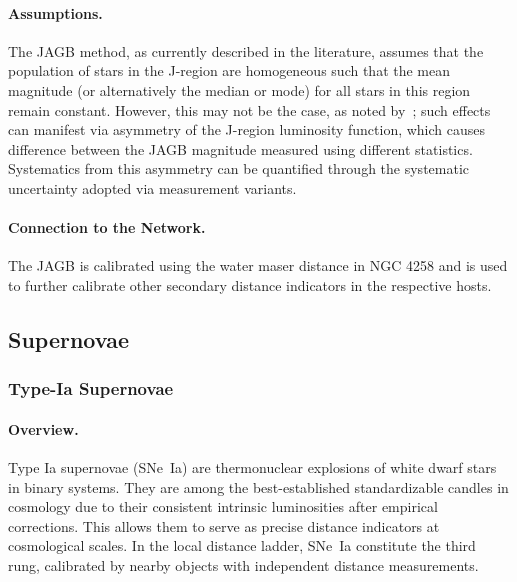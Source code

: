 \paragraph{Assumptions.} The JAGB method, as  currently described in the literature, assumes that the population of stars in the J-region are homogeneous such that the mean magnitude (or alternatively the median or mode) for all stars in this region remain constant. However, this may not be the case, as noted by~\citet{2020MNRAS.495.2858R, 2021MNRAS.501..933P,2023MNRAS.522..195P, 2024ApJ...966...20L, 2025arXiv250205259L}; such effects can manifest via asymmetry of the J-region luminosity function, which causes difference between the JAGB magnitude measured using different statistics. Systematics from this asymmetry can be quantified through the systematic uncertainty adopted via measurement variants. 

\paragraph{Connection to the Network.} 
The JAGB is calibrated using the water maser distance in NGC 4258 and is used to further calibrate other secondary distance indicators in the respective hosts.

\subsection{Supernovae}
\subsubsection{Type-Ia Supernovae}

\paragraph{Overview.}
Type Ia supernovae (SNe~Ia) are thermonuclear explosions of white dwarf stars in binary systems. They are among the best-established standardizable candles in cosmology due to their consistent intrinsic luminosities after empirical corrections. This allows them to serve as precise distance indicators at cosmological scales. In the local distance ladder, SNe~Ia constitute the third rung, calibrated by nearby objects with independent distance measurements.

